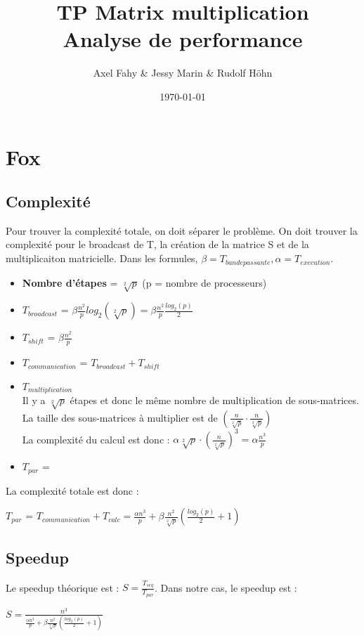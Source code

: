 \documentclass[a4paper]{article}
\title{TP Matrix multiplication\\Analyse de performance}
\author{Axel Fahy \& Jessy Marin \& Rudolf Höhn}
\date{\today}
\begin{document}
\maketitle

\section{Fox}

\subsection{Complexité}
Pour trouver la complexité totale, on doit séparer le problème. On doit trouver la complexité pour le broadcast de T, la création de la matrice S et de la multiplicaiton matricielle.
Dans les formules, $\beta = T_{bande passante}, \alpha = T_{execution}$.
\begin{itemize}
    \item \textbf{Nombre d'étapes} = $\sqrt[2]{p}$ (p = nombre de processeurs)
    \item \textbf{\boldmath$T_{broadcast}$} = $\beta \frac{n^2}{p} log_2(\sqrt[2]{p}) = \beta \frac{n^2}{p} \frac{log_2(p)}{2}$
    \item \textbf{\boldmath$T_{shift}$} = $\beta \frac{n^2}{p}$
    \item \textbf{\boldmath$T_{communication}$} = $T_{broadcast} + T_{shift}$
    \item \textbf{\boldmath$T_{multiplication}$}\\
    Il y a $\sqrt[2]{p}$ étapes et donc le même nombre de multiplication de sous-matrices.\\
    La taille des sous-matrices à multiplier est de $(\frac{n}{\sqrt[2]{p}} \cdot \frac{n}{\sqrt[2]{p}})$\\
    La complexité du calcul est donc : $\alpha \sqrt[2]{p} \cdot (\frac{n}{\sqrt[2]{p}})^3 = \alpha \frac{n^3}{p}$
\item \textbf{\boldmath$T_{par}$} =
\end{itemize}

La complexité totale est donc :
\begin{center}
\textbf{\boldmath$T_{par}$} = $T_{communication} + T_{calc} = \frac{\alpha n^3}{p} + \beta \frac{n^2}{\sqrt[2]{p}}(\frac{log_2(p)}{2} + 1)$
\end{center}

\subsection{Speedup}
Le speedup théorique est : $S = \frac{T_{seq}}{T_{par}}$. Dans notre cas, le speedup est :
\begin{center}
    $S=\frac{n^3}{\frac{\alpha n^3}{p} + \beta \frac{n^2}{\sqrt[2]{p}}(\frac{log_2(p)}{2} + 1)}$
\end{center}
\end{document}
